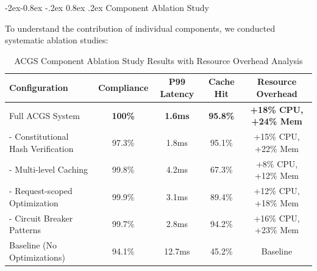 \documentclass[manuscript,screen,9pt]{acmart}
\makeatletter
\renewcommand\subsubsection{\@startsection{subsubsection}{3}{\z@}%
  {-2ex\@plus -0.8ex \@minus -.2ex}%
  {0.8ex \@plus .2ex}%
  {\normalfont\normalsize\bfseries}}
\newcommand{\tablesize}{\footnotesize}
\newcommand{\tableheader}[1]{\textbf{#1}}
\makeatother
\begin{document}
\subsubsection{Component Ablation Study}
\label{subsubsec:ablation_study}

To understand the contribution of individual components, we conducted systematic ablation studies:

\begin{table}[!htb]
	\centering
	\caption{ACGS Component Ablation Study Results with Resource Overhead Analysis}
	\label{tab:ablation_study}
	\tablesize
	\begin{tabular}{@{}lcccc@{}}
		\toprule
		\tableheader{Configuration}        & \tableheader{Compliance} & \tableheader{P99 Latency} & \tableheader{Cache Hit} & \tableheader{Resource Overhead} \\
		\midrule
		Full ACGS System                   & \textbf{100\%}           & \textbf{1.6ms}            & \textbf{95.8\%}         & \textbf{+18\% CPU, +24\% Mem}   \\
		- Constitutional Hash Verification & 97.3\%                   & 1.8ms                     & 95.1\%                  & +15\% CPU, +22\% Mem            \\
		- Multi-level Caching              & 99.8\%                   & 4.2ms                     & 67.3\%                  & +8\% CPU, +12\% Mem             \\
		- Request-scoped Optimization      & 99.9\%                   & 3.1ms                     & 89.4\%                  & +12\% CPU, +18\% Mem            \\
		- Circuit Breaker Patterns         & 99.7\%                   & 2.8ms                     & 94.2\%                  & +16\% CPU, +23\% Mem            \\
		Baseline (No Optimizations)        & 94.1\%                   & 12.7ms                    & 45.2\%                  & Baseline                        \\
		\bottomrule
	\end{tabular}
\end{table}
\end{document}
